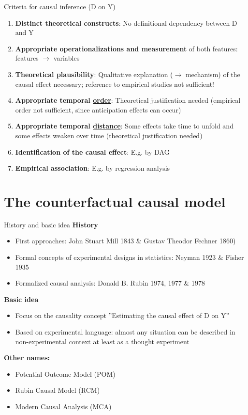 \documentclass{beamer}\usepackage[]{graphicx}\usepackage[]{color}
\begin{document}
\begin{frame}{Criteria for causal inference (D on Y)}
  \begin{enumerate} 
    \item \textbf{Distinct theoretical constructs}: No definitional dependency between D and Y
    \item \textbf{Appropriate operationalizations and measurement} of both features: features $\rightarrow$ variables
    \item \textbf{Theoretical plausibility}: Qualitative explanation ($\rightarrow$ mechanism) of the causal effect necessary; reference to empirical studies not sufficient!
    \item \textbf{Appropriate temporal \underline{order}}: Theoretical justification needed (empirical order not sufficient, since anticipation effects can occur)
    \item \textbf{Appropriate temporal \underline{distance}}: Some effects take time to unfold and some effects weaken over time (theoretical justification needed)
    \item \textbf{Identification of the causal effect}: E.g. by DAG
    \item \textbf{Empirical association}: E.g. by regression analysis
  \end{enumerate}
\end{frame}


\section{The counterfactual causal model} %


\begin{frame}{History and basic idea}
\textbf{History}
  \begin{itemize}
    \item First approaches: John Stuart Mill 1843 \& Gustav Theodor Fechner 1860)
    \item Formal concepts of experimental designs in statistics: Neyman 1923 \& Fisher 1935
    \item Formalized causal analysis: Donald B. Rubin 1974, 1977 \& 1978
  \end{itemize}
\textbf{Basic idea}  
  \begin{itemize}
    \item Focus on the causality concept ''Estimating the causal effect of D on Y''
    \item Based on experimental language: almost any situation can be described in non-experimental context at least as a thought experiment
  \end{itemize}  
\textbf{Other names:}  
  \begin{itemize}
    \item Potential Outcome Model (POM)
    \item Rubin Causal Model (RCM)
    \item Modern Causal Analysis (MCA)
  \end{itemize}   
\end{frame}
\end{document}
